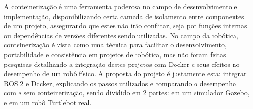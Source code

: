 A conteinerização é uma ferramenta poderosa no campo de desenvolvimento e implementação, disponibilizando certa camada de isolamento entre componentes de um projeto, assegurando que estes não irão conflitar, seja por funções internas ou dependências de versões diferentes sendo utilizadas. No campo da robótica, conteinerização é vista como uma técnica para facilitar o desenvolvimento, portabilidade e consistência em projetos de robótica, mas não foram feitas pesquisas detalhando a integração destes projetos com Docker e seus efeitos no desempenho de um robô físico. A proposta do projeto é justamente esta: integrar ROS 2 e Docker, explicando os passos utilizados e comparando o desempenho com e sem conteinerização, sendo dividido em 2 partes: em um simulador Gazebo, e em um robô Turtlebot real.
\begin{comment}
    \begin{itemize}
    \item Contexto
    \begin{enumerate}
        \item Como esse tópico se encaixa no contexto da área de pesquisa?\\
        R: Se encaixa na pesquisa pois estamos utilizando técnicas da área da ciência da computação para implementar e avaliar o desempenho de ROS + Docker.
        \item Qual a relevância do tópico escolhido para a área de estudo?\\
        R: O trabalho é relevante pois pode ajudar futuros projetos utilizando ROS+Docker, ao evidenciar certas falhas e/ou perdas de desempenho relacionado com essa integração
        \item Quais eventos históricos e/ou recentes que contextualizam esse tópico?\\
        R: O crescimento do uso de containers em projetos com grande quantidade de complexidade/dependências [colocar artigo aqui]
    \end{enumerate}
    \item Problema de pesquisa
    \begin{enumerate}
        \item Qual a questão central que seu TCC se propõe a abordar?\\
        R: Diferenças de desempenho relacionada à integração Docker, além de possível incompatibilidades/peculiariades relacionadas.
        \item Por que esse problema é significativo ou merece investigação?\\

\end{comment}
